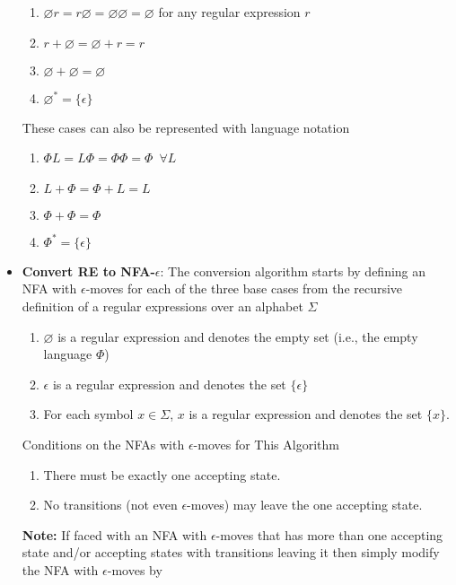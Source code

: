 \documentclass{report}
\begin{document}
\begin{itemize}
        \begin{enumerate}
            \item $\varnothing r  = r\varnothing = \varnothing\varnothing = \varnothing$ for any regular expression $r$
            \item $r + \varnothing = \varnothing + r = r $
            \item $\varnothing + \varnothing = \varnothing $
            \item $\varnothing^{*} = \{\epsilon\} $
        \end{enumerate}
        These cases can also be represented with language notation
        \begin{enumerate}
            \item $\Phi L  = L\Phi = \Phi\Phi = \Phi$\ $\forall L$
            \item $L + \Phi = \Phi + L = L $
            \item $\Phi + \Phi = \Phi $
            \item $\Phi^{*} = \{\epsilon\} $
        \end{enumerate}
    \item \textbf{Convert RE to NFA-$\epsilon$}: The conversion algorithm starts by defining an NFA with $\epsilon$-moves for each of the three base cases from the recursive definition of a regular expressions over an alphabet $\Sigma$
        \begin{enumerate}
            \item $\varnothing$ is a regular expression and denotes the empty set (i.e., the empty language $\Phi$)
            \item $\epsilon$ is a regular expression and denotes the set $\{\epsilon\}$
            \item For each symbol $x \in \Sigma$, $x$ is a regular expression and denotes the set $\{x\} $.
        \end{enumerate}
        \bigbreak \noindent 
        Conditions on the NFAs with $\epsilon$-moves for This Algorithm
        \begin{enumerate}
            \item  There must be exactly one accepting state.
            \item No transitions (not even $\epsilon$-moves) may leave the one accepting state.
        \end{enumerate}
        \bigbreak \noindent 
        \textbf{Note:} If faced with an NFA with $\epsilon$-moves that has more than one accepting state and/or accepting states with transitions leaving it then simply modify the NFA with $\epsilon$-moves by

\end{itemize}
\end{document}
